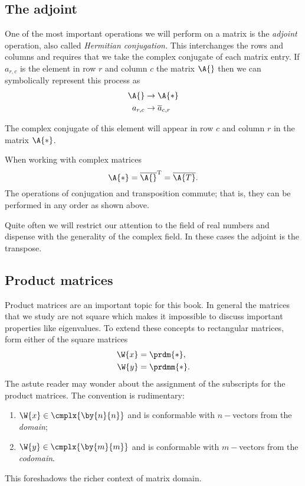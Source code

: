 \subsection{The adjoint}
One of the most important operations we will perform on a matrix is the \textit{adjoint} operation, also called \textit{Hermitian conjugation.} This interchanges the rows and columns and requires that we take the complex conjugate of each matrix entry. If $a_{r,c}$ is the element in row $r$ and column $c$ the matrix $\A{}$ then we can symbolically represent this process as 
\begin{equation}
  \begin{split}
    \A{} &\to \A{*}\\
    a_{r,c} &\to \overline{a}_{c,r}
  \end{split}
\end{equation}

The complex conjugate of this element will appear in row $c$ and column $r$ in the matrix $\A{*}$.

When working with complex matrices
\begin{equation}
    \A{*}= \overline{\A{}}^{\mathrm{T}}= \overline{\A{T}}.
\end{equation}
The operations of conjugation and transposition commute; that is, they can be performed in any order as shown above.

Quite often we will restrict our attention to the field of real numbers and dispense with the generality of the complex field. In these cases the adjoint is the transpose.

\subsection{Product matrices}
Product matrices are an important topic for this book. In general the matrices that we study are not square which makes it impossible to discuss important properties like eigenvalues. To extend these concepts to rectangular matrices, form either of the square matrices
\begin{equation}
  \begin{split}
    \W{x} &= \prdm{*}, \\
    \W{y} &= \prdmm{*}.
    \label{eq:prelim:w}
  \end{split}
\end{equation}
The astute reader may wonder about the assignment of the subscripts for the product matrices. The convention is rudimentary:
\begin{enumerate}
\item $\W{x}\in\cmplx{\by{n}{n}}$ and is conformable with $n-$vectors from the \textit{domain};
\item $\W{y}\in\cmplx{\by{m}{m}}$ and is conformable with $m-$vectors from the \textit{codomain}.
\end{enumerate}
This foreshadows the richer context of matrix domain.

